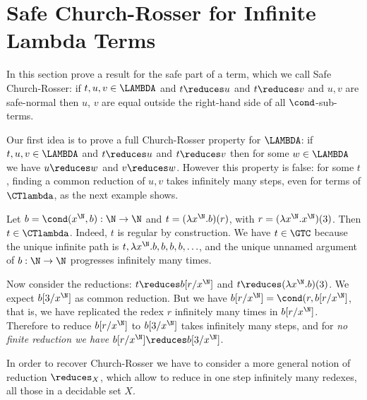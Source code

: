 
\section{Safe Church-Rosser for Infinite Lambda Terms}
\label{section-safe-church-rosser}

In this section prove a result for the safe part of a term, which we call Safe Church-Rosser: 
if $t,u,v \in \LAMBDA$ and $t \reduces u$ and $t \reduces v$ and $u, v$ are safe-normal 
then $u$, $v$ are equal outside the right-hand side of all $\cond$-sub-terms.


Our first idea is to prove a full Church-Rosser property for $\LAMBDA$: 
if $t,u,v \in \LAMBDA$ and $t \reduces u$ and $t \reduces v$ then for some $w \in \LAMBDA$
we have $u \reduces w$ and $v \reduces w$. However this property is false: for some $t$, finding a 
common reduction of $u,v$ takes infinitely many steps, even for terms of $\CTlambda$,
as the next example shows.

\begin{Eg}
Let $b = \cond(x^{\N},b):\N \rightarrow \N$ 
and $t = (\lambda x^{\N}.b)(r)$, with $r = (\lambda x^{\N}.x^{\N})(3)$. Then $t \in \CTlambda$.
Indeed, $t$ is regular by construction.
We have $t \in \GTC$ because the unique infinite path is $t, \lambda x^{\N}.b, b, b, b, \ldots$, and the
unique unnamed argument of $b:\N \rightarrow \N$ progresses infinitely many times.

Now consider the reductions: $t \reduces b[r/x^\N]$ and $t \reduces  (\lambda x^{\N}.b)(3)$.
We expect $b[3/x^\N]$ as common reduction. But we have $b[r/x^\N] = \cond(r,b[r/x^\N]$,
that is, we have replicated the redex $r$ infinitely many times in $b[r/x^\N]$. Therefore to reduce 
$b[r/x^\N]$ to $b[3/x^\N]$ takes infinitely many steps, and for \emph{no finite reduction we have}
$b[r/x^\N] \reduces b[3/x^\N]$.
\end{Eg}

In order to recover Church-Rosser we have to consider a more general notion of reduction $\reduces_X$, 
which allow to reduce in one step infinitely many redexes, all those in a decidable set $X$.

